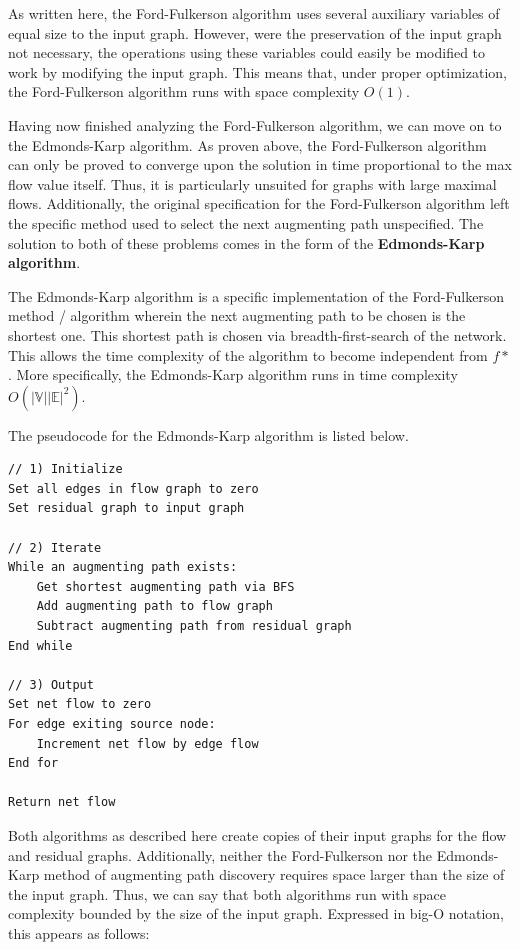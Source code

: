 \documentclass[12pt]{amsart}
\begin{document}
    As written here, the Ford-Fulkerson algorithm uses several
    auxiliary variables of equal size to the input graph.
    However, were the preservation of the input graph not
    necessary, the operations using these variables could easily
    be modified to work by modifying the input graph. This
    means that, under proper optimization, the Ford-Fulkerson
    algorithm runs with space complexity $O(1)$.

    Having now finished analyzing the Ford-Fulkerson algorithm,
    we can move on to the Edmonds-Karp algorithm. As proven
    above, the Ford-Fulkerson algorithm can only be proved to
    converge upon the solution in time proportional to the max
    flow value itself. Thus, it is particularly unsuited for
    graphs with large maximal flows. Additionally, the original
    specification for the Ford-Fulkerson algorithm left the
    specific method used to select the next augmenting path
    unspecified. The solution to both of these problems comes
    in the form of the \textbf{Edmonds-Karp algorithm}.

    The Edmonds-Karp algorithm is a specific implementation of
    the Ford-Fulkerson method / algorithm wherein the next
    augmenting path to be chosen is the shortest one. This
    shortest path is chosen via breadth-first-search of the
    network. This allows the time complexity of the algorithm
    to become independent from $f*$. More specifically, the
    Edmonds-Karp algorithm runs in time complexity
    $O(\vert \mathbb{V} \vert \vert \mathbb{E} \vert ^2)$.

    The pseudocode for the Edmonds-Karp algorithm is listed
    below.

\begin{verbatim}
// 1) Initialize
Set all edges in flow graph to zero
Set residual graph to input graph

// 2) Iterate
While an augmenting path exists:
    Get shortest augmenting path via BFS
    Add augmenting path to flow graph
    Subtract augmenting path from residual graph
End while

// 3) Output
Set net flow to zero
For edge exiting source node:
    Increment net flow by edge flow
End for

Return net flow
\end{verbatim}

    Both algorithms as described here create copies of their
    input graphs for the flow and residual graphs. Additionally,
    neither the Ford-Fulkerson nor the Edmonds-Karp method of
    augmenting path discovery requires space larger than the
    size of the input graph. Thus, we can say that both
    algorithms run with space complexity bounded by the size of
    the input graph. Expressed in big-O notation, this appears
    as follows:
\end{document}
